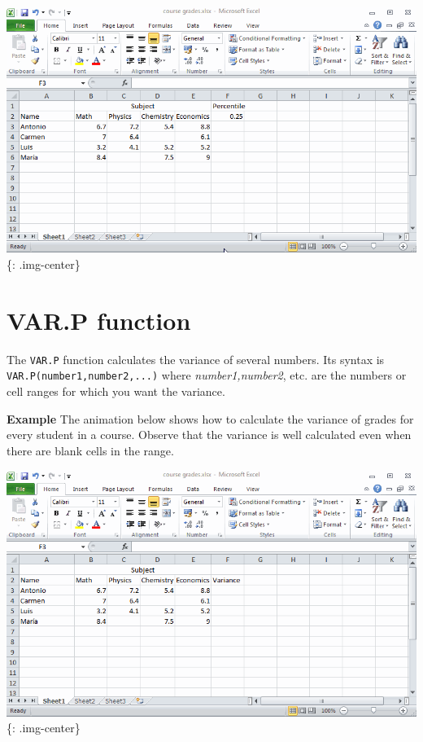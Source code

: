 \includegraphics[keepaspectratio,width=\textwidth,height=0.75\textheight]{img/example_function_percentile.gif}
\{: .img-center\}

\section{VAR.P function}
\label{var.pfunction}

The \texttt{VAR.P} function calculates the variance of several numbers. Its syntax is \texttt{VAR.P(number1,number2,...)} where \emph{number1,number2}, etc. are the numbers or cell ranges for which you want the variance. 

\textbf{Example} The animation below shows how to calculate the variance of grades for every student in a course. Observe that the variance is well calculated even when there are blank cells in the range. 

\includegraphics[keepaspectratio,width=\textwidth,height=0.75\textheight]{img/example_function_varp.gif}
\{: .img-center\}

